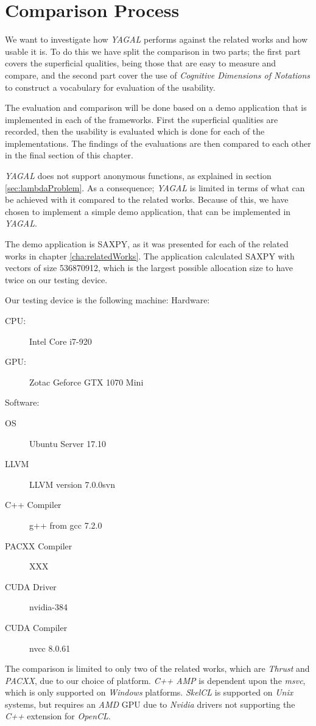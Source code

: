 \section{Comparison Process}
We want to investigate how \textit{YAGAL} performs against the related works and how usable it is. To do this we have split the comparison in two parts; the first part covers the superficial qualities, being those that are easy to measure and compare, and the second part cover the use of \textit{Cognitive Dimensions of Notations} to construct a vocabulary for evaluation of the usability.

The evaluation and comparison will be done based on a demo application that is implemented in each of the frameworks. First the superficial qualities are recorded, then the usability is evaluated which is done for each of the implementations. The findings of the evaluations are then compared to each other in the final section of this chapter.

\textit{YAGAL} does not support anonymous functions, as explained in section \ref{sec:lambdaProblem}. As a consequence; \textit{YAGAL} is limited in terms of what can be achieved with it compared to the related works. Because of this, we have chosen to implement a simple demo application, that can be implemented in \textit{YAGAL}. 

The demo application is SAXPY, as it was presented for each of the related works in chapter \ref{cha:relatedWorks}. The application calculated SAXPY with vectors of size 536870912, which is the largest possible allocation size to have twice on our testing device.

Our testing device is the following machine:
Hardware:
\begin{description}
\item[CPU:] Intel Core i7-920
\item[GPU:] Zotac Geforce GTX 1070 Mini
\end{description}

Software:
\begin{description}
\item[OS] Ubuntu Server 17.10
\item[LLVM] LLVM version  7.0.0svn
\item[C++ Compiler] g++ from gcc 7.2.0
\item[PACXX Compiler] XXX
\item[CUDA Driver] nvidia-384
\item[CUDA Compiler] nvcc 8.0.61
\end{description}


The comparison is limited to only two of the related works, which are \textit{Thrust} and \textit{PACXX}, due to our choice of platform. \textit{C++ AMP} is dependent upon the \textit{msvc}, which is only supported on \textit{Windows} platforms. \textit{SkelCL} is supported on \textit{Unix} systems, but requires an \textit{AMD} GPU due to \textit{Nvidia} drivers not supporting the \textit{C++} extension for \textit{OpenCL}.
